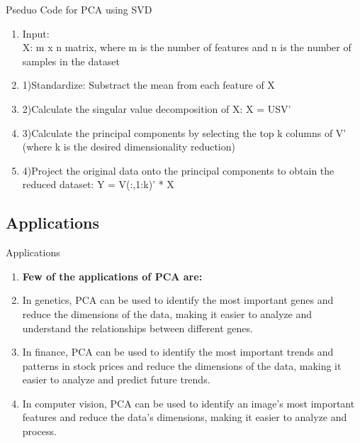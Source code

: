 \documentclass{beamer}
\begin{document}
\begin{frame}{Pseduo Code for PCA using SVD}
    \begin{enumerate}
        \item Input: \\
        X: m x n matrix, where m is the number of features and n is the number of samples in the dataset
        \item 1)Standardize: Substract the mean from each feature of X
        \item 2)Calculate the singular value decomposition of X: X = USV'
        \item 3)Calculate the principal components by selecting the top k columns of V' (where k is the desired dimensionality reduction)
        \item 4)Project the original data onto the principal components to obtain the reduced dataset: Y = V(:,1:k)' * X
    \end{enumerate}
\end{frame}

\subsection{Applications}
\begin{frame}{Applications}
    \begin{enumerate}
        \item \textbf{Few of the applications of PCA are:}
        \item In genetics, PCA can be used to identify the most important genes and reduce the dimensions of the data, making it easier to analyze and understand the relationships between different genes.
        \item In finance, PCA can be used to identify the most important trends and patterns in stock prices and reduce the dimensions of the data, making it easier to analyze and predict future trends.
        \item In computer vision, PCA can be used to identify an image's most important features and reduce the data's dimensions, making it easier to analyze and process. 
    \end{enumerate}
\end{frame}
\end{document}
